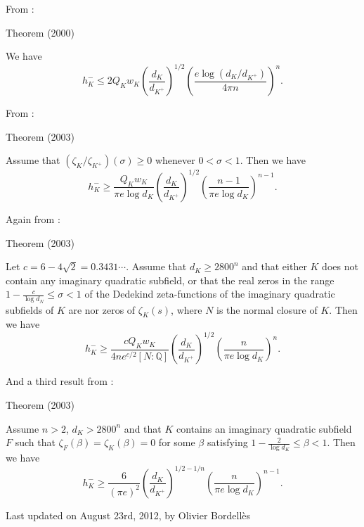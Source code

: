 From \cite{Louboutin*00}:
\begin{thm}{Theorem (2000)}

  We have
  $$
  h^-_K
  \le
  2Q_Kw_K\left(\frac{d_K}{d_{K^+}}\right)^{1/2}
  \left(
  \frac{e\log(d_K/d_{K^+})}{4\pi n}
  \right)^n.
  $$
\end{thm}


From \cite{Louboutin*03}:
\begin{thm}{Theorem (2003)}

  Assume that $(\zeta_K/\zeta_{K^+})(\sigma)\ge0$ whenever $0 < \sigma <
  1$. Then we have
  $$
  h^-_K
  \ge
  \frac{Q_Kw_K}{\pi e \log d_K}
  \left(\frac{d_K}{d_{K^+}}\right)^{1/2}
  \left(
  \frac{n-1}{\pi e\log d_K}
  \right)^{n-1}.
  $$
\end{thm}


Again from \cite{Louboutin*03}:
\begin{thm}{Theorem (2003)}

  Let $c=6-4\sqrt{2}=0.3431\cdots$. Assume that $d_K\ge 2800^n$ and that
  either $K$ does not contain any imaginary quadratic subfield, or that the
  real zeros in the range $1-\frac{c}{\log d_N}\le \sigma < 1$ of the Dedekind
  zeta-functions of the imaginary quadratic subfields of $K$ are nor zeros of
  $\zeta_K(s)$, where $N$ is the normal closure of $K$. Then we have
  $$
  h^-_K
  \ge
  \frac{cQ_Kw_K}{4ne^{c/2}[N:\mathbb{Q}]}
  \left(\frac{d_K}{d_{K^+}}\right)^{1/2}
  \left(
  \frac{n}{\pi e\log d_K}
  \right)^{n}.
  $$
\end{thm}


And a third result from \cite{Louboutin*03}:
\begin{thm}{Theorem (2003)}

  Assume $n > 2$, $d_K > 2800^n$ and that
  $K$ contains an imaginary quadratic subfield $F$ such that
  $\zeta_F(\beta)=\zeta_K(\beta)=0$ for some $\beta$ satisfying
  $1-\frac{2}{\log d_K}\le \beta < 1$.
  Then we have
  $$
  h^-_K
  \ge
  \frac{6}{(\pi e)^2}
  \left(\frac{d_K}{d_{K^+}}\right)^{1/2-1/n}
  \left(
  \frac{n}{\pi e\log d_K}
  \right)^{n-1}.
  $$
\end{thm}






 
 







  
  Last updated on August 23rd, 2012, by Olivier Bordell\`es















